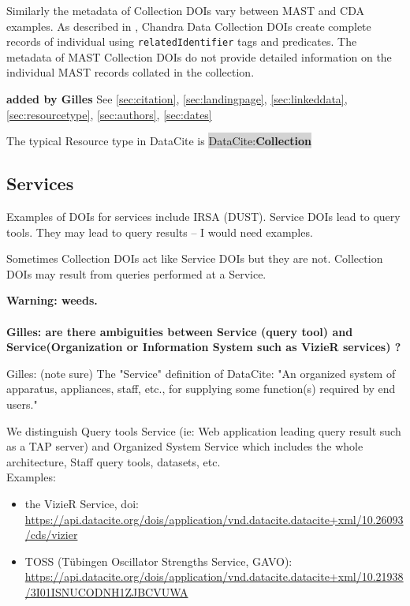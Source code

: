 \documentclass[11pt,a4paper]{ivoa}
\newcommand{\dataciteterm}[1]{\colorbox{lightgray}{DataCite:\textbf{#1}}}
\begin{document}
Similarly the metadata of Collection DOIs vary between MAST and CDA examples. 
As described in \citet{2023ChNew..34....5D}, Chandra Data Collection DOIs create complete records of individual using \texttt{relatedIdentifier} tags and predicates. 
The metadata of MAST Collection DOIs do not provide detailed information on the individual MAST records collated in the collection.


\textbf{\color{red} added by Gilles}
See \ref{sec:citation}, \ref{sec:landingpage}, \ref{sec:linkeddata}, \ref{sec:resourcetype}, \ref{sec:authors}, \ref{sec:dates}

The typical Resource type in DataCite is \dataciteterm{Collection}

\subsection{Services}
\label{sec:intro:services}

Examples of DOIs for services include IRSA (DUST).
Service DOIs lead to query tools.
They may lead to query results -- I would need examples.

Sometimes Collection DOIs act like Service DOIs but they are not.
Collection DOIs may result from queries performed at a Service.

\textbf{Warning: weeds.}

\paragraph{}
\textbf{\color{red} Gilles: are there ambiguities between Service (query tool) and Service(Organization or Information System such as VizieR services) ?\\}

{\color{red} Gilles: (note sure)
    The "Service" definition of DataCite: "An organized system of apparatus, appliances, staff, etc., for supplying some function(s) required by end users."

    We distinguish Query tools Service (ie: Web application leading query result such as a TAP server) and Organized System Service which includes the whole architecture, Staff query tools, datasets, etc. \\
    
    Examples:
    \begin{itemize}
    	\item the VizieR Service, doi:\\ \url{https://api.datacite.org/dois/application/vnd.datacite.datacite+xml/10.26093/cds/vizier}
    	\item TOSS (Tübingen Oscillator Strengths Service, GAVO):\\ \url{https://api.datacite.org/dois/application/vnd.datacite.datacite+xml/10.21938/3I01ISNUCODNH1ZJBCVUWA}
    \end{itemize} 

}
\end{document}
